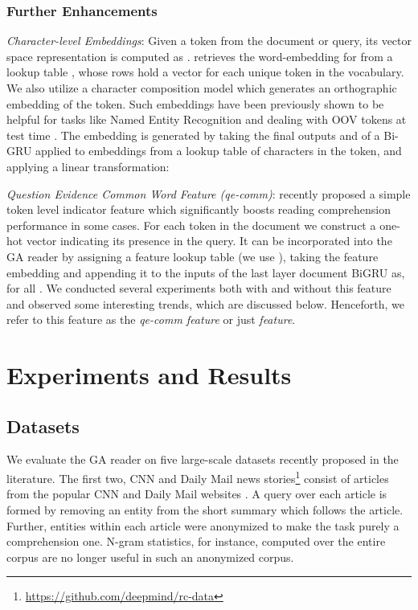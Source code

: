 \documentclass[11pt,a4paper]{article}
\begin{document}
\subsubsection{Further Enhancements}
\label{sec:tricks}
\emph{Character-level Embeddings}: Given a token  from the document or query, its vector space representation is computed as .  retrieves the word-embedding for  from a lookup table , whose rows hold a vector for each unique token in the vocabulary. We also utilize a character composition model  which generates an orthographic embedding of the token. Such embeddings have been previously shown to be helpful for tasks like Named Entity Recognition \citep{yang2016multi} and dealing with OOV tokens at test time \citep{dhingra2016tweet2vec}. The embedding  is generated by taking the final outputs  and  of a Bi-GRU applied to embeddings from a lookup table of characters in the token, and applying a linear transformation:


\emph{Question Evidence Common Word Feature (qe-comm)}: \citet{li2016dataset} recently proposed a simple token level indicator feature which significantly boosts reading comprehension performance in some cases. For each token in the document we construct a one-hot vector  indicating its presence in the query. It can be incorporated into the GA reader by assigning a feature lookup table  (we use ), taking the feature embedding  and appending it to the inputs of the last layer document BiGRU as,  for all . We conducted several experiments both with and without this feature and observed some interesting trends, which are discussed below. Henceforth, we refer to this feature as the \textit{qe-comm feature} or just \textit{feature}.

\section{Experiments and Results}
\label{sec:results}
\subsection{Datasets}


We evaluate the GA reader on five large-scale datasets recently proposed in the literature. The first two, CNN and Daily Mail news stories\footnote{\scriptsize \url{https://github.com/deepmind/rc-data}} consist of articles from the popular CNN and Daily Mail websites \citep{hermann2015teaching}. A query over each article is formed by removing an entity from the short summary which follows the article. Further, entities within each article were anonymized to make the task purely a comprehension one. N-gram statistics, for instance, computed over the entire corpus are no longer useful in such an anonymized corpus.
\end{document}
